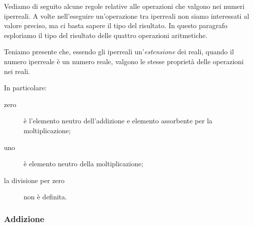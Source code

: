 Vediamo di seguito alcune regole relative alle operazioni 
che valgono nei numeri iperreali. 
A volte nell'eseguire un'operazione tra iperreali 
non siamo interessati al valore preciso, ma 
ci basta sapere il tipo del risultato. 
In questo paragrafo esploriamo il tipo del risultato delle quattro 
operazioni aritmetiche.

Teniamo presente che, essendo gli iperreali un'\emph{estensione} dei reali, 
quando il numero iperreale è un numero reale, valgono le stesse proprietà 
delle operazioni nei reali.

In particolare: 
\begin{description} %
\item [zero] è l'elemento neutro dell'addizione e 
elemento assorbente per la moltiplicazione;
\item [uno] è elemento neutro della moltiplicazione;
\item [la divisione per zero] non è definita.
\end{description}


\bigskip %
\newpage %

\subsubsection{Addizione}
\label{subsec:insnum_addizione}

